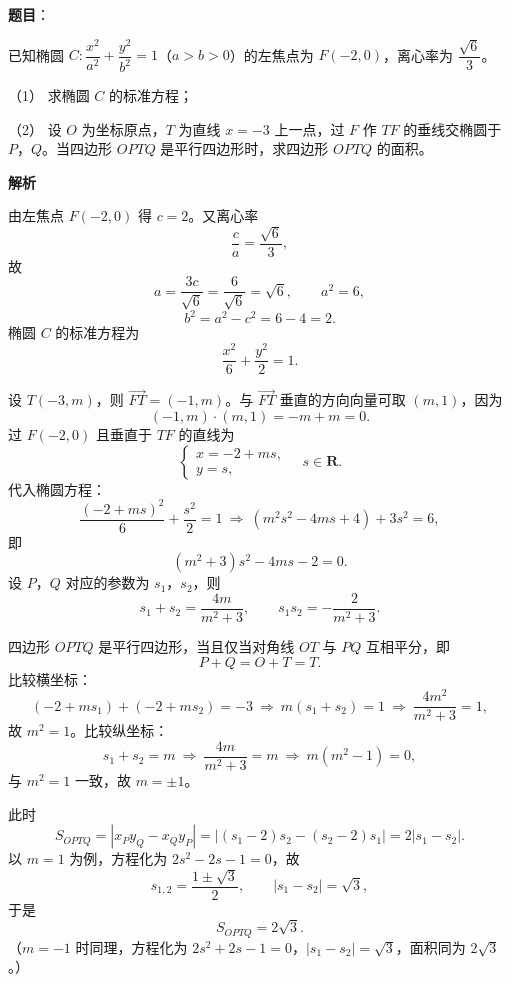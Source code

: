 \begin{answer}

\textbf{题目}：

已知椭圆 $C:\dfrac{x^2}{a^2}+\dfrac{y^2}{b^2}=1$（$a>b>0$）的左焦点为 $F(-2,0)$，离心率为 $\dfrac{\sqrt6}3$。

（1） 求椭圆 $C$ 的标准方程；

（2） 设 $O$ 为坐标原点，$T$ 为直线 $x=-3$ 上一点，过 $F$ 作 $TF$ 的垂线交椭圆于 $P$，$Q$。当四边形 $OPTQ$ 是平行四边形时，求四边形 $OPTQ$ 的面积。

\textbf{解析}


由左焦点 $F(-2,0)$ 得 $c=2$。又离心率
\nopagebreak[4]
\[\frac ca=\frac{\sqrt6}3,\]
故
\nopagebreak[4]
\[a=\frac{3c}{\sqrt6}=\frac{6}{\sqrt6}=\sqrt6,\qquad a^2=6,\]
\nopagebreak[4]
\[b^2=a^2-c^2=6-4=2 .\]
椭圆 $C$ 的标准方程为
\nopagebreak[4]
\[\frac{x^2}6+\frac{y^2}2=1 .\]


设 $T(-3,m)$，则 $\overrightarrow{FT}=(-1,m)$。与 $\overrightarrow{FT}$ 垂直的方向向量可取 $(m,1)$，因为
\nopagebreak[4]
\[(-1,m)\cdot(m,1)=-m+m=0 .\]
过 $F(-2,0)$ 且垂直于 $TF$ 的直线为
\nopagebreak[4]
\[\begin{cases}x=-2+ms,\\y=s,\end{cases}\quad s\in\mathbf R .\]
代入椭圆方程：
\nopagebreak[4]
\[\frac{(-2+ms)^2}6+\frac{s^2}2=1
\ \Longrightarrow\ (m^2s^2-4ms+4)+3s^2=6,\]
即
\nopagebreak[4]
\[(m^2+3)s^2-4ms-2=0 .\]
设 $P$，$Q$ 对应的参数为 $s_1$，$s_2$，则
\nopagebreak[4]
\[s_1+s_2=\frac{4m}{m^2+3},\qquad s_1s_2=-\frac2{m^2+3}.\]

四边形 $OPTQ$ 是平行四边形，当且仅当对角线 $OT$ 与 $PQ$ 互相平分，即
\nopagebreak[4]
\[P+Q=O+T=T .\]
比较横坐标：
\nopagebreak[4]
\[(-2+ms_1)+(-2+ms_2)=-3
\ \Longrightarrow\ m(s_1+s_2)=1
\ \Longrightarrow\ \frac{4m^2}{m^2+3}=1,\]
故 $m^2=1$。比较纵坐标：
\nopagebreak[4]
\[s_1+s_2=m\ \Longrightarrow\ \frac{4m}{m^2+3}=m\ \Longrightarrow\ m(m^2-1)=0,\]
与 $m^2=1$ 一致，故 $m=\pm1$。

此时
\nopagebreak[4]
\[S_{OPTQ}=\left|x_Py_Q-x_Qy_P\right|
=\left|(s_1-2)s_2-(s_2-2)s_1\right|
=2|s_1-s_2| .\]
以 $m=1$ 为例，方程化为 $2s^2-2s-1=0$，故
\nopagebreak[4]
\[s_{1,2}=\frac{1\pm\sqrt3}2,\qquad |s_1-s_2|=\sqrt3,\]
于是
\nopagebreak[4]
\[S_{OPTQ}=2\sqrt3 .\]
（$m=-1$ 时同理，方程化为 $2s^2+2s-1=0$，$|s_1-s_2|=\sqrt3$，面积同为 $2\sqrt3$。）


\end{answer}
